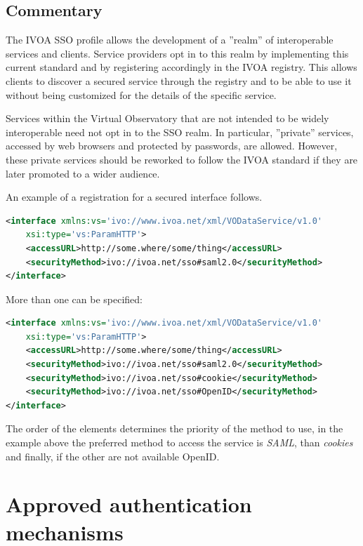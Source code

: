 \documentclass[11pt,a4paper]{ivoa}
\begin{document}
\subsection{Commentary}
The IVOA SSO profile allows the development of a ''realm'' of interoperable services and clients. 
Service providers opt in to this realm by implementing this current standard and by registering accordingly in the IVOA registry. 
This allows clients to discover a secured service through the registry and to be able to use it without 
being customized for the details of the specific service.

Services within the Virtual Observatory that are not intended to be widely interoperable need not opt in to the SSO realm. 
In particular, ''private'' services, accessed by web browsers and protected by passwords, are allowed. 
However, these private services should be reworked to follow the IVOA standard if they are later promoted to a wider audience.

An example of a registration for a secured interface follows.
\begin{lstlisting}[language=XML]
<interface xmlns:vs='ivo://www.ivoa.net/xml/VODataService/v1.0'  
	xsi:type='vs:ParamHTTP'>
	<accessURL>http://some.where/some/thing</accessURL>
	<securityMethod>ivo://ivoa.net/sso#saml2.0</securityMethod>
</interface> 
\end{lstlisting}

More than one  can be specified:
\begin{lstlisting}[language=XML]
<interface xmlns:vs='ivo://www.ivoa.net/xml/VODataService/v1.0'  
	xsi:type='vs:ParamHTTP'>
	<accessURL>http://some.where/some/thing</accessURL>
	<securityMethod>ivo://ivoa.net/sso#saml2.0</securityMethod>
	<securityMethod>ivo://ivoa.net/sso#cookie</securityMethod>
	<securityMethod>ivo://ivoa.net/sso#OpenID</securityMethod>
</interface> 
\end{lstlisting}

The order of the  elements determines the priority of the method to use, in the example above the preferred method to access 
the service is {\em SAML}, than {\em cookies} and finally, if the other are not available OpenID.

\section{Approved authentication mechanisms}
\end{document}
